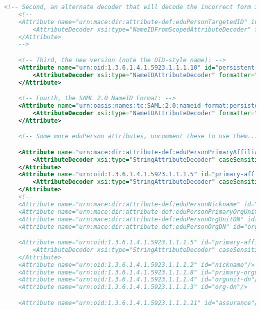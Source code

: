 \begin{lstlisting}[language=xml]
    <!-- Second, an alternate decoder that will decode the incorrect form into the newer form. -->
    <!--
    <Attribute name="urn:mace:dir:attribute-def:eduPersonTargetedID" id="persistent-id">
        <AttributeDecoder xsi:type="NameIDFromScopedAttributeDecoder" formatter="$NameQualifier!$SPNameQualifier!$Name" defaultQualifiers="true"/>
    </Attribute>
    -->

    <!-- Third, the new version (note the OID-style name): -->
    <Attribute name="urn:oid:1.3.6.1.4.1.5923.1.1.1.10" id="persistent-id">
        <AttributeDecoder xsi:type="NameIDAttributeDecoder" formatter="$NameQualifier!$SPNameQualifier!$Name" defaultQualifiers="true"/>
    </Attribute>

    <!-- Fourth, the SAML 2.0 NameID Format: -->
    <Attribute name="urn:oasis:names:tc:SAML:2.0:nameid-format:persistent" id="persistent-id">
        <AttributeDecoder xsi:type="NameIDAttributeDecoder" formatter="$NameQualifier!$SPNameQualifier!$Name" defaultQualifiers="true"/>
    </Attribute>

    <!-- Some more eduPerson attributes, uncomment these to use them... -->

    <Attribute name="urn:mace:dir:attribute-def:eduPersonPrimaryAffiliation" id="primary-affiliation">
        <AttributeDecoder xsi:type="StringAttributeDecoder" caseSensitive="false"/>
    </Attribute>
    <Attribute name="urn:oid:1.3.6.1.4.1.5923.1.1.1.5" id="primary-affiliation">
        <AttributeDecoder xsi:type="StringAttributeDecoder" caseSensitive="false"/>
    </Attribute>
    <!--
    <Attribute name="urn:mace:dir:attribute-def:eduPersonNickname" id="nickname"/>
    <Attribute name="urn:mace:dir:attribute-def:eduPersonPrimaryOrgUnitDN" id="primary-orgunit-dn"/>
    <Attribute name="urn:mace:dir:attribute-def:eduPersonOrgUnitDN" id="orgunit-dn"/>
    <Attribute name="urn:mace:dir:attribute-def:eduPersonOrgDN" id="org-dn"/>

    <Attribute name="urn:oid:1.3.6.1.4.1.5923.1.1.1.5" id="primary-affiliation">
        <AttributeDecoder xsi:type="StringAttributeDecoder" caseSensitive="false"/>
    </Attribute>
    <Attribute name="urn:oid:1.3.6.1.4.1.5923.1.1.1.2" id="nickname"/>
    <Attribute name="urn:oid:1.3.6.1.4.1.5923.1.1.1.8" id="primary-orgunit-dn"/>
    <Attribute name="urn:oid:1.3.6.1.4.1.5923.1.1.1.4" id="orgunit-dn"/>
    <Attribute name="urn:oid:1.3.6.1.4.1.5923.1.1.1.3" id="org-dn"/>

    <Attribute name="urn:oid:1.3.6.1.4.1.5923.1.1.1.11" id="assurance"/>


\end{lstlisting}
